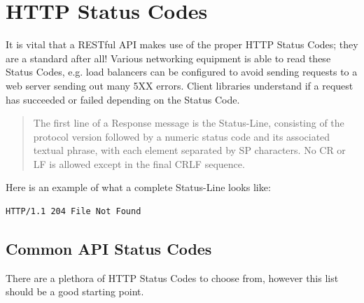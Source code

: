 \documentclass{book}
\begin{document}
\section{HTTP Status Codes}

It is vital that a RESTful API makes use of the proper HTTP Status Codes; they are a standard after all! Various networking equipment is able to read these Status Codes, e.g. load balancers can be configured to avoid sending requests to a web server sending out many 5XX errors. Client libraries understand if a request has succeeded or failed depending on the Status Code.

\begin{quote}
The first line of a Response message is the Status-Line, consisting of the protocol version followed by a numeric status code and its associated textual phrase, with each element separated by SP characters. No CR or LF is allowed except in the final CRLF sequence.\cite{RFC2616}
\end{quote}

Here is an example of what a complete Status-Line looks like:

\begin{verbatim}
HTTP/1.1 204 File Not Found
\end{verbatim}

\subsection{Common API Status Codes}

There are a plethora of HTTP Status Codes \cite{RFC2616} to choose from, however this list should be a good starting point.
\end{document}
